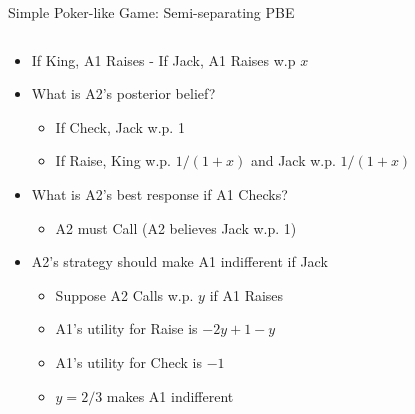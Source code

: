 \documentclass[11pt,aspectratio=169]{beamer}
\begin{document}
  
  \begin{frame}{Simple Poker-like Game: Semi-separating PBE}
   \begin{columns}
    \begin{column}{0.6\textwidth}
     \begin{itemize}[<+->] \scriptsize
      \item If King, A1 Raises - If Jack, A1 Raises w.p $x$
      \item What is A2's posterior belief?
      \begin{itemize}\scriptsize
       \item If Check, Jack w.p. 1
       \item If Raise, King w.p. $1/(1+x)$ and Jack w.p. $1/(1+x)$
      \end{itemize}
      \item What is A2's best response if A1 Checks?
      \begin{itemize}\scriptsize
       \item A2 must Call (A2 believes Jack w.p. 1)
      \end{itemize}
      \item A2's strategy should make A1 indifferent if Jack
      \begin{itemize}\scriptsize
       \item Suppose A2 Calls w.p. $y$ if A1 Raises
       \item A1's utility for Raise is $-2y+1-y$
       \item A1's utility for Check is $-1$
       \item $y = 2/3$ makes A1 indifferent
      \end{itemize}
     \end{itemize}
    \end{column}
    \begin{column}{0.4\textwidth}   
     \begin{center}
\end{center}
\end{column}
\end{columns}
\end{frame}
\end{document}

